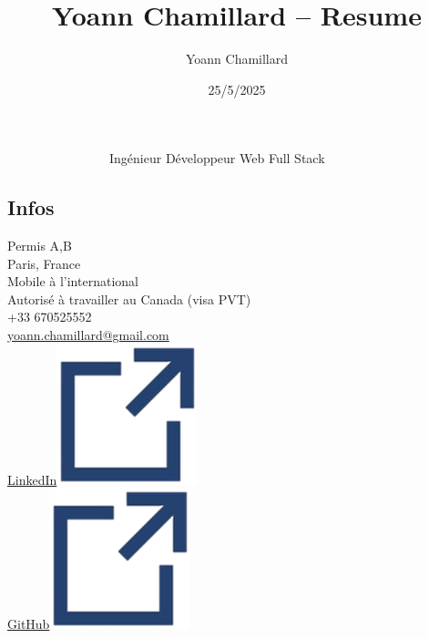 \documentclass[]{friggeri-cv}
\title{Yoann Chamillard -- Resume}
\author{Yoann Chamillard}
\date{25/5/2025}
\begin{document}
      {~~~~~~~~~~~~~~~~Ingénieur Développeur Web Full Stack}
      {}

\begin{aside}
\vspace{21mm}
\section{Infos}

Permis A,B\\
\vspace{2.5mm}
Paris, France\\
\vspace{1.5mm}
Mobile à l'international\\
Autorisé à travailler au Canada (visa PVT)\\
\vspace{2.5mm}
+33 670525552\\
\href{mailto:yoann.chamillard@gmail.com}{\small yoann.chamillard@gmail.com}\\
\vspace{2.5mm}
\href{http://fr.linkedin.com/in/yoannchamillard}{LinkedIn\hspace{1.5mm}\includegraphics[scale=0.075]{res/img/hlink.png}}\\
\href{https://github.com/Nokheenig?tab=stars}{GitHub\hspace{1.5mm}\includegraphics[scale=0.075]{res/img/hlink.png}}\\
\vspace{2.5mm}
\\
\\
\\
\\
\vspace{2.5mm}%


\end{aside}
\end{document}
